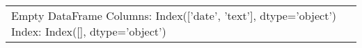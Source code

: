 \begin{supertabular}{p{0.07\textwidth}p{0.25\textwidth}}
Empty DataFrame
Columns: Index(['date', 'text'], dtype='object')
Index: Index([], dtype='object') \\
\end{supertabular}
